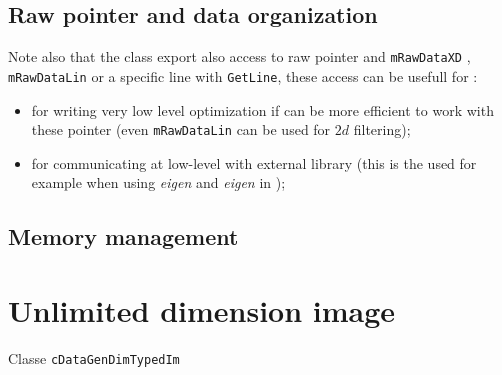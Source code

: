 \subsection{Raw pointer and data organization}

Note also that the class export also access to raw pointer and {\tt mRawDataXD} , {\tt mRawDataLin}
or a specific line with {\tt GetLine},
these access can be usefull for :

\begin{itemize}
    \item for writing very low level optimization if can be more efficient to work with these
          pointer (even {\tt mRawDataLin} can be used for $2d$ filtering);

    \item for communicating at low-level with external library (this is the used for example
          when using \emph{eigen} and \emph{eigen} in \PPP);

\end{itemize}



\subsection{Memory management}




\section{Unlimited dimension image}
\label{UlimDimIm}

Classe {\tt cDataGenDimTypedIm}



